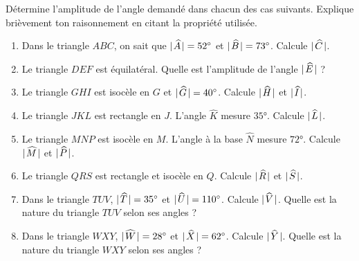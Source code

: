 \documentclass[../../syllabus_1.tex]{subfiles}
\begin{document}
\begin{exercise}
    Détermine l'amplitude de l'angle demandé dans chacun des cas suivants. Explique brièvement ton raisonnement en citant la propriété utilisée.

    \begin{enumerate}[itemsep=2cm]
        \item Dans le triangle $ABC$, on sait que $\lvert\mkern2mu\widehat{A}\mkern2mu\rvert = \ang{52}$ et $\lvert\mkern2mu\widehat{B}\mkern2mu\rvert = \ang{73}$. Calcule $\lvert\mkern2mu\widehat{C}\mkern2mu\rvert$.

        \item Le triangle $DEF$ est équilatéral. Quelle est l'amplitude de l'angle $\lvert\mkern2mu\widehat{E}\mkern2mu\rvert$ ?

        \item Le triangle $GHI$ est isocèle en $G$ et $\lvert\mkern2mu\widehat{G}\mkern2mu\rvert=\ang{40}$. Calcule $\lvert\mkern2mu\widehat{H}\mkern2mu\rvert$ et $\lvert\mkern2mu\widehat{I}\mkern2mu\rvert$.

        \item Le triangle $JKL$ est rectangle en $J$. L'angle $\widehat{K}$ mesure $\ang{35}$. Calcule $\lvert\mkern2mu\widehat{L}\mkern2mu\rvert$.

        \item Le triangle $MNP$ est isocèle en $M$. L'angle à la base $\widehat{N}$ mesure $\ang{72}$. Calcule $\lvert\mkern2mu\widehat{M}\mkern2mu\rvert$ et $\lvert\mkern2mu\widehat{P}\mkern2mu\rvert$.

        \item Le triangle $QRS$ est rectangle et isocèle en $Q$. Calcule $\lvert\mkern2mu\widehat{R}\mkern2mu\rvert$ et $\lvert\mkern2mu\widehat{S}\mkern2mu\rvert$.

        \item Dans le triangle $TUV$, $\lvert\mkern2mu\widehat{T}\mkern2mu\rvert = \ang{35}$ et $\lvert\mkern2mu\widehat{U}\mkern2mu\rvert = \ang{110}$. Calcule $\lvert\mkern2mu\widehat{V}\mkern2mu\rvert$. Quelle est la nature du triangle $TUV$ selon ses angles ?

        \item Dans le triangle $WXY$, $\lvert\mkern2mu\widehat{W}\mkern2mu\rvert = \ang{28}$ et $\lvert\mkern2mu\widehat{X}\mkern2mu\rvert = \ang{62}$. Calcule $\lvert\mkern2mu\widehat{Y}\mkern2mu\rvert$. Quelle est la nature du triangle $WXY$ selon ses angles ?
    \end{enumerate}
    \vspace*{2cm}
\end{exercise}
\end{document}
